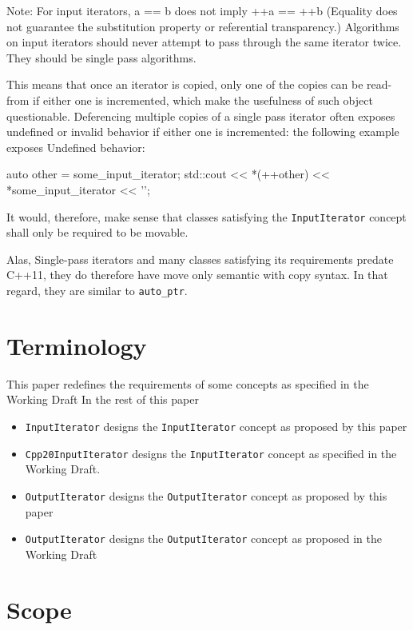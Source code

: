 \documentclass{wg21}
\begin{document}
Note: For input iterators, a == b does not imply ++a == ++b (Equality
does not guarantee the substitution property or referential
transparency.) Algorithms on input iterators should never attempt to
pass through the same iterator twice. They should be single pass
algorithms.

This means that once an iterator is copied, only one of the copies can
be read-from if either one is incremented, which make the usefulness of
such object questionable. Deferencing multiple copies of a single pass
iterator often exposes undefined or invalid behavior if either one is
incremented: the following example exposes Undefined behavior: 
\begin{codeblock}

auto other = some_input_iterator;
std::cout << *(++other) << *some_input_iterator << '\n';
\end{codeblock}

It would, therefore, make sense that classes satisfying the
\texttt{InputIterator} concept shall only be required to be movable.

Alas, Single-pass iterators and many classes satisfying its requirements
predate C++11, they do therefore have move only semantic with copy
syntax. In that regard, they are similar to \texttt{auto\_ptr}.

\hypertarget{terminology}{%
	\section{Terminology}\label{terminology}}

This paper redefines the requirements of some concepts as specified in
the Working Draft In the rest of this paper

\begin{itemize}
	\item
	\texttt{InputIterator} designs the \texttt{InputIterator} concept as
	proposed by this paper
	\item
	\texttt{Cpp20InputIterator} designs the \texttt{InputIterator} concept
	as specified in the Working Draft.
	\item
	\texttt{OutputIterator} designs the \texttt{OutputIterator} concept as
	proposed by this paper
	\item
	\texttt{OutputIterator} designs the \texttt{OutputIterator} concept as
	proposed in the Working Draft
\end{itemize}

\hypertarget{scope}{%
	\section{Scope}\label{scope}}
\end{document}
